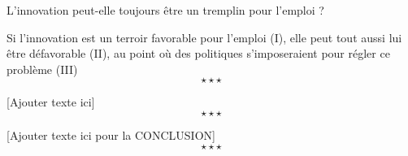 	\hspace*{.5cm}L'innovation peut-elle toujours être un tremplin pour l'emploi ?\newline
	
	\hspace*{.5cm}Si l'innovation est un terroir favorable pour l'emploi (I), elle peut tout aussi lui être défavorable (II), au point où des politiques s'imposeraient pour régler ce problème (III) $$\star \star \star$$


[Ajouter texte ici] $$\star \star \star$$

[Ajouter texte ici pour la CONCLUSION] $$\star \star \star$$


